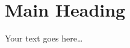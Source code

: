 \documentclass{article}
\begin{document}
\section{Main Heading}

Your text goes here…

%
%
\end{document}
